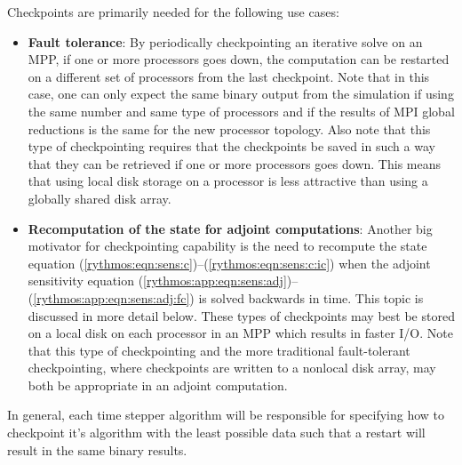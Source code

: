 \documentclass[pdf,ps2pdf,11pt]{SANDreport}
\begin{document}
Checkpoints are primarily needed for the following use cases:
%
\begin{itemize}
%
{}\item {}\textbf{Fault tolerance}: By periodically checkpointing an iterative
solve on an MPP, if one or more processors goes down, the computation can be
restarted on a different set of processors from the last checkpoint.  Note
that in this case, one can only expect the same binary output from the
simulation if using the same number and same type of processors and if the
results of MPI global reductions is the same for the new processor topology.
Also note that this type of checkpointing requires that the checkpoints be
saved in such a way that they can be retrieved if one or more processors goes
down.  This means that using local disk storage on a processor is less
attractive than using a globally shared disk array.
%
{}\item {}\textbf{Recomputation of the state for adjoint computations}:
Another big motivator for checkpointing capability is the need to recompute
the state equation (\ref{rythmos:eqn:sens:c})--(\ref{rythmos:eqn:sens:c:ic})
when the adjoint sensitivity equation
(\ref{rythmos:app:eqn:sens:adj})--(\ref{rythmos:app:eqn:sens:adj:fc}) is
solved backwards in time.  This topic is discussed in more detail below.
These types of checkpoints may best be stored on a local disk on each
processor in an MPP which results in faster I/O.  Note that this type of
checkpointing and the more traditional fault-tolerant checkpointing, where
checkpoints are written to a nonlocal disk array, may both be appropriate in
an adjoint computation.
%
\end{itemize}

In general, each time stepper algorithm will be responsible for specifying how
to checkpoint it's algorithm with the least possible data such that a restart
will result in the same binary results.
\end{document}
